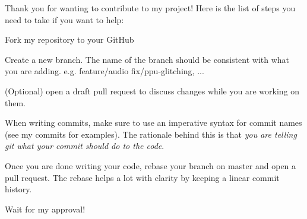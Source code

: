 Thank you for wanting to contribute to my project! Here is the list of steps you need to take if you want to help\+:


\begin{DoxyEnumerate}
\item Fork my repository to your Git\+Hub
\item Create a new branch. The name of the branch should be consistent with what you are adding. e.\+g. {\ttfamily feature/audio} {\ttfamily fix/ppu-\/glitching}, ...
\item (Optional) open a draft pull request to discuss changes while you are working on them.
\item When writing commits, make sure to use an imperative syntax for commit names (see my commits for examples). The rationale behind this is that {\itshape you are telling git what your commit should do to the code}.
\item Once you are done writing your code, rebase your branch on master and open a pull request. The rebase helps a lot with clarity by keeping a linear commit history.
\item Wait for my approval! 
\end{DoxyEnumerate}